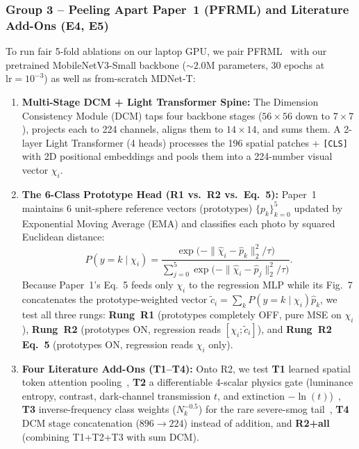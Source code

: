 \documentclass[conference]{IEEEtran}
\begin{document}
\subsubsection{
  Group 3 -- Peeling Apart Paper~1 (PFRML) and Literature Add-Ons (E4, E5)
}

To run fair 5-fold ablations on our laptop GPU, we pair
PFRML~\cite{wangPrototypeFeatureRepresentationGuided2026} with our pretrained
MobileNetV3-Small backbone ($\sim 2.0\text{M}$ parameters, 30 epochs at
$\text{lr} = 10^{-3}$) as well as from-scratch MDNet-T:
\begin{enumerate}
  \item \textbf{Multi-Stage DCM + Light Transformer Spine:} The Dimension
        Consistency Module (DCM) taps four backbone stages ($56 \times 56$ down
        to $7 \times 7$), projects each to 224 channels, aligns them to
        $14 \times 14$, and sums them. A 2-layer Light Transformer (4 heads)
        processes the 196 spatial patches + \texttt{[CLS]} with 2D positional
        embeddings and pools them into a 224-number visual vector $\chi_i$.
  \item \textbf{The 6-Class Prototype Head (R1 vs.\ R2 vs.\ Eq.~5):} Paper~1
        maintains 6 unit-sphere reference vectors (prototypes) $\{p_k\}_{k=0}^5$
        updated by Exponential Moving Average (EMA) and classifies each photo by
        squared Euclidean distance:
        \begin{equation}
          P(y = k \mid \chi_i) = \frac{\exp\!\big( -\|\hat{\chi}_i - \hat{p}_k\|_2^2 / \tau \big)}{\sum_{j=0}^{5} \exp\!\big( -\|\hat{\chi}_i - \hat{p}_j\|_2^2 / \tau \big)}. \label{eq:proto_softmax}
        \end{equation}
        Because Paper~1's Eq.~5 feeds only $\chi_i$ to the regression MLP while
        its Fig.~7 concatenates the prototype-weighted vector
        $\tilde{c}_i = \sum_k P(y = k \mid \chi_i)\hat{p}_k$, we test all three
        rungs: \textbf{Rung~R1} (prototypes completely OFF, pure MSE on
        $\chi_i$), \textbf{Rung~R2} (prototypes ON, regression reads
        $[\chi_i; \tilde{c}_i]$), and \textbf{Rung~R2 Eq.~5} (prototypes ON,
        regression reads $\chi_i$ only).
  \item \textbf{Four Literature Add-Ons (T1--T4):} Onto R2, we test \textbf{T1}
        learned spatial token attention
        pooling~\cite{abdelsalamSkyFuseNetCrossAttentionSwin2026,
        leeEnhancingPM25Detection2025}, \textbf{T2} a differentiable 4-scalar
        physics gate (luminance entropy, contrast, dark-channel transmission
        $t$, and extinction $-\ln(t)$)~\cite{dohaDeepMultiTaskLearning2026,
        yadavRoadsideTreeImageBased2025}, \textbf{T3} inverse-frequency class
        weights ($N_k^{-0.5}$) for the rare severe-smog
        tail~\cite{dohaDeepMultiTaskLearning2026,
        bylerLocationGeneralizabilityImageBased2025}, \textbf{T4} DCM stage
        concatenation ($896 \to 224$) instead of addition, and \textbf{R2+all}
        (combining T1+T2+T3 with sum DCM).
\end{enumerate}
\end{document}
